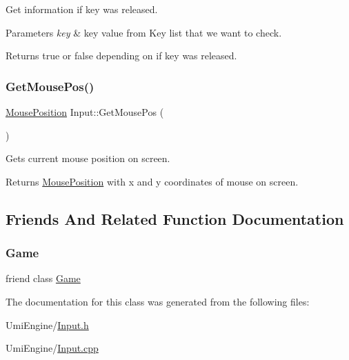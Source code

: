 Get information if key was released. 


\begin{DoxyParams}{Parameters}
{\em key} & key value from Key list that we want to check. \\
\hline
\end{DoxyParams}
\begin{DoxyReturn}{Returns}
true or false depending on if key was released. 
\end{DoxyReturn}
\mbox{\label{class_input_a946fb755b072d22267097e7118c752c0}} 
\subsubsection{\texorpdfstring{GetMousePos()}{GetMousePos()}}
{\footnotesize\ttfamily \mbox{\hyperlink{struct_mouse_position}{Mouse\+Position}} Input\+::\+Get\+Mouse\+Pos (\begin{DoxyParamCaption}{ }\end{DoxyParamCaption})\hspace{0.3cm}{\ttfamily [static]}}



Gets current mouse position on screen. 

\begin{DoxyReturn}{Returns}
\mbox{\hyperlink{struct_mouse_position}{Mouse\+Position}} with x and y coordinates of mouse on screen. 
\end{DoxyReturn}


\subsection{Friends And Related Function Documentation}
\mbox{\label{class_input_aa2fab026580d6f14280c2ffb8063a314}} 
\subsubsection{\texorpdfstring{Game}{Game}}
{\footnotesize\ttfamily friend class \mbox{\hyperlink{class_game}{Game}}\hspace{0.3cm}{\ttfamily [friend]}}



The documentation for this class was generated from the following files\+:\begin{DoxyCompactItemize}
\item 
Umi\+Engine/\mbox{\hyperlink{_input_8h}{Input.\+h}}\item 
Umi\+Engine/\mbox{\hyperlink{_input_8cpp}{Input.\+cpp}}\end{DoxyCompactItemize}
